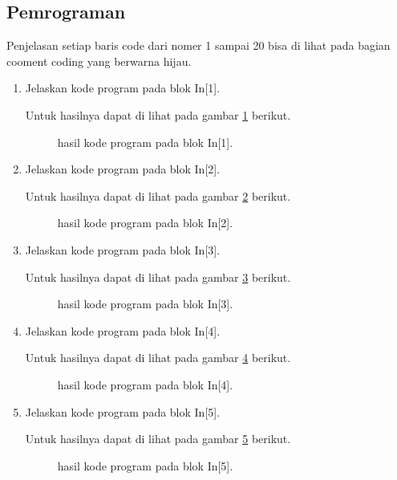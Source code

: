 \subsection{Pemrograman}
Penjelasan setiap baris code dari nomer 1 sampai 20 bisa di lihat pada bagian cooment coding yang berwarna hijau.
\begin{enumerate}
\item Jelaskan kode program pada blok  In[1].

Untuk hasilnya dapat di lihat pada gambar \ref{c141} berikut.
\begin{figure}[!htbp]
      \caption{hasil kode program pada blok  In[1].}
      \label{c141}
      \end{figure}

\item Jelaskan kode program pada blok  In[2].

Untuk hasilnya dapat di lihat pada gambar \ref{c142} berikut.
\begin{figure}[!htbp]
      \caption{hasil kode program pada blok  In[2].}
      \label{c142}
      \end{figure}


\item Jelaskan kode program pada blok  In[3].

Untuk hasilnya dapat di lihat pada gambar \ref{c143} berikut.
\begin{figure}[!htbp]
      \caption{hasil kode program pada blok  In[3].}
      \label{c143}
      \end{figure}

\item Jelaskan kode program pada blok  In[4].

Untuk hasilnya dapat di lihat pada gambar \ref{c144} berikut.
\begin{figure}[!htbp]
      \caption{hasil kode program pada blok  In[4].}
      \label{c144}
      \end{figure}

\item Jelaskan kode program pada blok  In[5].

Untuk hasilnya dapat di lihat pada gambar \ref{c145} berikut.
\begin{figure}[!htbp]
      \caption{hasil kode program pada blok  In[5].}
      \label{c145}
      \end{figure}


\end{enumerate}
